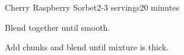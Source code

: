 \documentclass[../Cookbook.tex]{subfiles}
\begin{document}
\begin{recipe}{Cherry Raspberry Sorbet}{2-3 servings}{20 minutes}

Blend together until smooth.

Add chunks and blend until mixture is thick.

\end{recipe}
\end{document}
